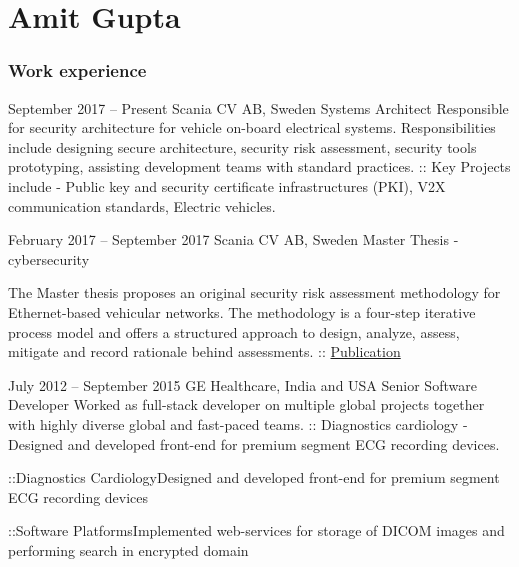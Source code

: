 \documentclass{tccv}
\begin{document}
\part{Amit Gupta}

\section{Work experience}

\begin{eventlist}

\item{September 2017 -- Present}
     {Scania CV AB, Sweden}
     {Systems Architect}\newline
        Responsible for security architecture for vehicle on-board electrical systems. Responsibilities include designing secure architecture, security risk assessment, security tools prototyping, assisting development teams with standard practices.\newline
        :: Key Projects include - Public key and security certificate infrastructures (PKI), V2X communication standards, Electric vehicles.

\item{February 2017 -- September 2017}
     {Scania CV AB, Sweden}
     {Master Thesis - cybersecurity}

        The Master thesis proposes an original security risk assessment methodology for Ethernet-based vehicular networks. The methodology is a four-step iterative process model and offers a structured approach to design, analyze, assess, mitigate and record rationale behind assessments.\newline
        :: \href{http://essay.utwente.nl/73894/}{Publication}
        
\item{July 2012 -- September 2015}
     {GE Healthcare, India and USA}
     {Senior Software Developer} \newline Worked as full-stack developer on multiple global projects together with highly diverse global and fast-paced teams. 
     \newline :: Diagnostics cardiology - Designed and developed front-end for premium segment ECG recording devices.
     \newline 
    \begin{yearlist}
    \item{::}{Diagnostics Cardiology}{Designed and developed front-end for premium segment ECG recording devices}  
    \item{::}{Software Platforms}{Implemented web-services for storage of DICOM images and performing search in encrypted domain}
\end{yearlist}


\end{eventlist}
\end{document}
